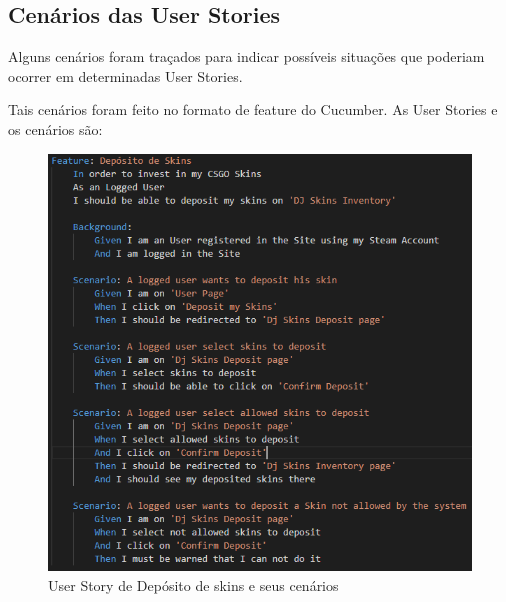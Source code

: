 \documentclass[
    12pt,               %
    openright,          %
    oneside,
    a4paper,            %
    MODELO,             %
    TODO,               %
    english,            %
    brazil              %
    ]{ifsp-spo-inf-ctds} %
\begin{document}
\begin{apendicesenv}

	\partapendices

	\chapter{Cenários das User Stories}
	\label{cenarios}
	Alguns cenários foram traçados para indicar possíveis situações que poderiam ocorrer em determinadas User Stories. 
	
	Tais cenários foram feito no formato de feature do Cucumber. As User Stories e os cenários são:
	
	\begin{figure}[!htb]
		\centering
		\includegraphics[scale=0.9]{Imagens/DepositoSkins.png}
		\caption{User Story de Depósito de skins e seus cenários}
	\end{figure}
	

\end{apendicesenv}
\end{document}
